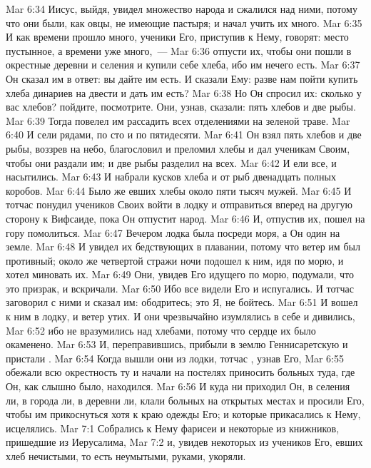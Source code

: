 \vs Mar 6:34 Иисус, выйдя, увидел множество народа и сжалился над ними, потому что они были, как овцы, не имеющие пастыря; и начал учить их много.
\vs Mar 6:35 И как времени прошло много, ученики Его, приступив к Нему, говорят: место  пустынное, а времени уже много,~---
\vs Mar 6:36 отпусти их, чтобы они пошли в окрестные деревни и селения и купили себе хлеба, ибо им нечего есть.
\vs Mar 6:37 Он сказал им в ответ: вы дайте им есть. И сказали Ему: разве нам пойти купить хлеба динариев на двести и дать им есть?
\vs Mar 6:38 Но Он спросил их: сколько у вас хлебов? пойдите, посмотрите. Они, узнав, сказали: пять хлебов и две рыбы.
\vs Mar 6:39 Тогда повелел им рассадить всех отделениями на зеленой траве.
\vs Mar 6:40 И сели рядами, по сто и по пятидесяти.
\vs Mar 6:41 Он взял пять хлебов и две рыбы, воззрев на небо, благословил и преломил хлебы и дал ученикам Своим, чтобы они раздали им; и две рыбы разделил на всех.
\vs Mar 6:42 И ели все, и насытились.
\vs Mar 6:43 И набрали кусков хлеба и  от рыб двенадцать полных коробов.
\vs Mar 6:44 Было же евших хлебы около пяти тысяч мужей.
\rsbpar\vs Mar 6:45 И тотчас понудил учеников Своих войти в лодку и отправиться вперед на другую сторону к Вифсаиде, пока Он отпустит народ.
\vs Mar 6:46 И, отпустив их, пошел на гору помолиться.
\vs Mar 6:47 Вечером лодка была посреди моря, а Он один на земле.
\vs Mar 6:48 И увидел их бедствующих в плавании, потому что ветер им был противный; около же четвертой стражи ночи подошел к ним, идя по морю, и хотел миновать их.
\vs Mar 6:49 Они, увидев Его идущего по морю, подумали, что это призрак, и вскричали.
\vs Mar 6:50 Ибо все видели Его и испугались. И тотчас заговорил с ними и сказал им: ободритесь; это Я, не бойтесь.
\vs Mar 6:51 И вошел к ним в лодку, и ветер утих. И они чрезвычайно изумлялись в себе и дивились,
\vs Mar 6:52 ибо не вразумились  над хлебами, потому что сердце их было окаменено.
\vs Mar 6:53 И, переправившись, прибыли в землю Геннисаретскую и пристали .
\vs Mar 6:54 Когда вышли они из лодки, тотчас , узнав Его,
\vs Mar 6:55 обежали всю окрестность ту и начали на постелях приносить больных туда, где Он, как слышно было, находился.
\vs Mar 6:56 И куда ни приходил Он, в селения ли, в города ли, в деревни ли, клали больных на открытых местах и просили Его, чтобы им прикоснуться хотя к краю одежды Его; и которые прикасались к Нему, исцелялись.
\vs Mar 7:1 Собрались к Нему фарисеи и некоторые из книжников, пришедшие из Иерусалима,
\vs Mar 7:2 и, увидев некоторых из учеников Его, евших хлеб нечистыми, то есть неумытыми, руками, укоряли.
